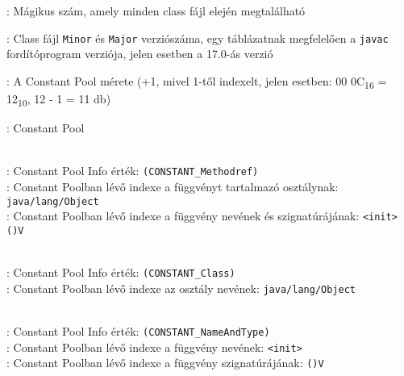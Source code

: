 \begin{compactitem}
\setlength\itemsep{-5px}
\item {}: Mágikus szám, amely minden class fájl elején megtalálható
\item {} : Class fájl \lstinline{Minor} és \lstinline{Major} verziószáma, egy táblázatnak megfelelően a \lstinline{javac} fordítóprogram verziója, jelen esetben a 17.0-ás verzió
\item {}: A Constant Pool mérete (+1, mivel 1-től indexelt, jelen esetben: 00 0C\textsubscript{16} = 12\textsubscript{10}, 12 - 1 = 11 db)
\item {}: Constant Pool
\begin{compactitem}
    \setlength\itemsep{-5px}
    \item {}   \\
    : Constant Pool Info érték: \lstinline{(CONSTANT_Methodref)} \\
    : Constant Poolban lévő indexe a függvényt tartalmazó osztálynak: \lstinline{java/lang/Object} \\
    : Constant Poolban lévő indexe a függvény nevének és szignatúrájának: \lstinline{<init> ()V}
    \item {}  \\
    : Constant Pool Info érték: \lstinline{(CONSTANT_Class)} \\
    : Constant Poolban lévő indexe az osztály nevének: \lstinline{java/lang/Object}
    \item {}   \\
    : Constant Pool Info érték: \lstinline{(CONSTANT_NameAndType)} \\
    : Constant Poolban lévő indexe a függvény nevének: \lstinline{<init>} \\
    : Constant Poolban lévő indexe a függvény szignatúrájának: \lstinline{()V}
	\item {}   \\

\end{compactitem}
\end{compactitem}

